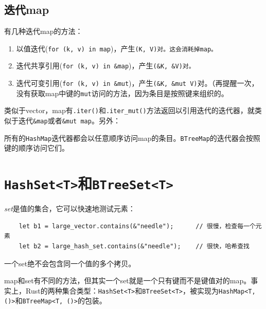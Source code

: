 \subsection{迭代map}
有几种迭代map的方法：
\begin{enumerate}
    \item 以值迭代(\texttt{for (k, v) in map})，产生\texttt{(K, V)对。这会消耗掉map。}
    \item 迭代共享引用(\texttt{for (k, v) in \&map})，产生\texttt{(\&K, \&V)对。}
    \item 迭代可变引用(\texttt{for (k, v) in \&mut})，产生\texttt{(\&K, \&mut V)}对。（再提醒一次，没有获取map中键的\texttt{mut}访问的方法，因为条目是按照键来组织的。
\end{enumerate}

类似于vector，map有\texttt{.iter()}和\texttt{.iter\_mut()}方法返回以引用迭代的迭代器，就类似于迭代\texttt{\&map}或者\texttt{\&mut map}。另外：




所有的\texttt{HashMap}迭代器都会以任意顺序访问map的条目。\texttt{BTreeMap}的迭代器会按照键的顺序访问它们。

\section{\texttt{HashSet<T>}和\texttt{BTreeSet<T>}}

\emph{set}是值的集合，它可以快速地测试元素：
\begin{verbatim}
    let b1 = large_vector.contains(&"needle");      // 很慢，检查每一个元素
    let b2 = large_hash_set.contains(&"needle");    // 很快，哈希查找
\end{verbatim}

一个set绝不会包含同一个值的多个拷贝。

map和set有不同的方法，但其实一个set就是一个只有键而不是键值对的map。事实上，Rust的两种集合类型：\texttt{HashSet<T>}和\texttt{BTreeSet<T>}，被实现为\texttt{HashMap<T, ()>}和\texttt{BTreeMap<T, ()>}的包装。




